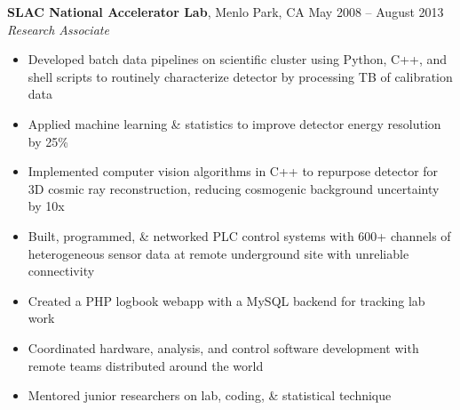 \documentclass[margin,line]{resume}
\begin{document}
\begin{resume}


    \textbf{SLAC National Accelerator Lab}, Menlo Park, CA \hfill May 2008 -- August 2013\vspace{1mm}\\\vspace{1mm}%
    \textsl{Research Associate}
    \begin{itemize}
    \item Developed batch data pipelines on scientific cluster using Python, C++, and shell scripts to routinely characterize detector by processing TB of calibration data
    \item Applied machine learning \& statistics to improve detector energy resolution by 25\%
    \item Implemented computer vision algorithms in C++ to repurpose detector for 3D cosmic ray reconstruction, reducing cosmogenic background uncertainty by 10x
    \item Built, programmed, \& networked PLC control systems with 600+ channels of heterogeneous sensor data at remote underground site with unreliable connectivity%
    \item Created a PHP logbook webapp with a MySQL backend for tracking lab work
    \item Coordinated hardware, analysis, and control software development with remote teams distributed around the world 
    \item Mentored junior researchers on lab, coding, \& statistical technique
    \end{itemize}



\end{resume}
\end{document}

